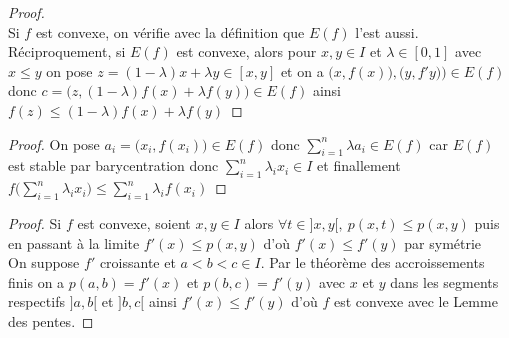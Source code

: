     \begin{proof} ~\\
    Si $f$ est convexe, on vérifie avec la définition que $E(f)$ l'est aussi. \\
    Réciproquement, si $E(f)$ est convexe, alors pour $x,y\in I$ et $\lambda\in [0,1] $ avec $x\leqslant y$ on pose $z=(1-\lambda )x + \lambda y \in [x,y]$ et on a $\big( x,f(x)\big) , \big( y,f'y) \big) \in E(f)$ donc $c=\big( z,(1-\lambda )f(x) + \lambda f(y) \big) \in E(f) $ ainsi $ f(z) \leqslant (1-\lambda )f(x) + \lambda f(y) $ 
    \end{proof} \medskip
    
    
    \begin{proof}
    On pose $a_i = \big( x_i ,f(x_i) \big) \in E(f)$ donc $\sum_{i=1}^n \lambda a_i \in E(f)$ car $E(f)$ est stable par barycentration 
    donc $\sum_{i=1}^n \lambda_i x_i \in I$ et finallement $f\big( \sum_{i=1}^n \lambda_i x_i \big) \leqslant \sum_{i=1}^n \lambda_i f(x_i)$
    \end{proof} \medskip
    
     \medskip
    
    
    \begin{proof}
    \fbox{$\Rightarrow$} Si $f$ est convexe, soient $x,y \in I$ alors $\forall t\in ]x,y[ ,~p(x,t)\leqslant p(x,y)$ puis en passant à la limite $f'(x) \leqslant p(x,y)$ d'où $f'(x)\leqslant f'(y)$ par symétrie \\
    \fbox{$\Leftarrow$} On suppose $f'$ croissante et $a<b<c \in I$. Par le théorème des accroissements finis on a $p(a,b) = f'(x)$ et $p(b,c) = f'(y)$ avec $x$ et $y$ dans les segments respectifs $]a,b[$ et $]b,c[$ ainsi $f'(x) \leqslant f'(y)$ d'où $f$ est convexe avec le Lemme des pentes.
    \end{proof}
    
